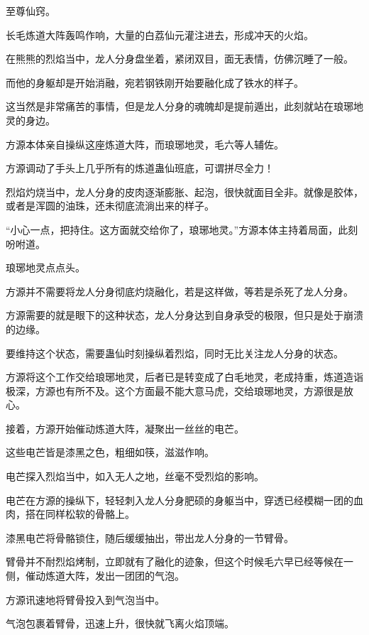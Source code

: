 
\begin{this_body}



至尊仙窍。

长毛炼道大阵轰鸣作响，大量的白荔仙元灌注进去，形成冲天的火焰。

在熊熊的烈焰当中，龙人分身盘坐着，紧闭双目，面无表情，仿佛沉睡了一般。

而他的身躯却是开始消融，宛若钢铁刚开始要融化成了铁水的样子。

这当然是非常痛苦的事情，但是龙人分身的魂魄却是提前遁出，此刻就站在琅琊地灵的身边。

方源本体亲自操纵这座炼道大阵，而琅琊地灵，毛六等人辅佐。

方源调动了手头上几乎所有的炼道蛊仙班底，可谓拼尽全力！

烈焰灼烧当中，龙人分身的皮肉逐渐膨胀、起泡，很快就面目全非。就像是胶体，或者是浑圆的油珠，还未彻底流淌出来的样子。

“小心一点，把持住。这方面就交给你了，琅琊地灵。”方源本体主持着局面，此刻吩咐道。

琅琊地灵点点头。

方源并不需要将龙人分身彻底灼烧融化，若是这样做，等若是杀死了龙人分身。

方源需要的就是眼下的这种状态，龙人分身达到自身承受的极限，但只是处于崩溃的边缘。

要维持这个状态，需要蛊仙时刻操纵着烈焰，同时无比关注龙人分身的状态。

方源将这个工作交给琅琊地灵，后者已是转变成了白毛地灵，老成持重，炼道造诣极深，方源也有所不及。这个方面最不能大意马虎，交给琅琊地灵，方源很是放心。

接着，方源开始催动炼道大阵，凝聚出一丝丝的电芒。

这些电芒皆是漆黑之色，粗细如筷，滋滋作响。

电芒探入烈焰当中，如入无人之地，丝毫不受烈焰的影响。

电芒在方源的操纵下，轻轻刺入龙人分身肥硕的身躯当中，穿透已经模糊一团的血肉，搭在同样松软的骨骼上。

漆黑电芒将骨骼锁住，随后缓缓抽出，带出龙人分身的一节臂骨。

臂骨并不耐烈焰烤制，立即就有了融化的迹象，但这个时候毛六早已经等候在一侧，催动炼道大阵，发出一团团的气泡。

方源讯速地将臂骨投入到气泡当中。

气泡包裹着臂骨，迅速上升，很快就飞离火焰顶端。


\end{this_body}
